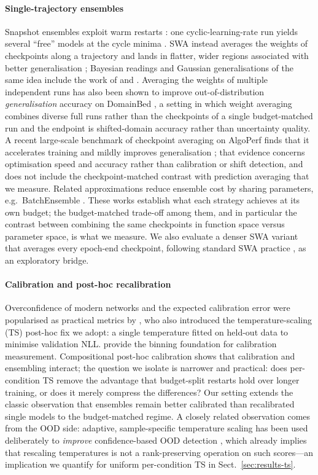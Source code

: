 \documentclass[11pt,a4paper]{article}
\newcommand{\swa}{\textsc{SWA}}
\newcommand{\ts}{\textsc{TS}}
\begin{document}
\paragraph{Single-trajectory ensembles}
Snapshot ensembles exploit warm restarts \citep{loshchilov2017}: one
cyclic-learning-rate run yields several ``free'' models at the cycle minima
\citep{huang2017}. \swa{} instead averages the weights of checkpoints along
a trajectory and lands in flatter, wider regions associated with better
generalisation \citep{izmailov2018}; Bayesian readings and Gaussian
generalisations of the same idea include the work of
\citet{wilson2020} and \citet{maddox2019}. Averaging the weights of
multiple independent runs has also been shown to improve out-of-distribution
\emph{generalisation} accuracy on DomainBed \citep{rame2022}, a setting in
which weight averaging combines diverse full runs rather than the
checkpoints of a single budget-matched run and the endpoint is shifted-domain
accuracy rather than uncertainty quality. A recent large-scale benchmark
of checkpoint averaging on AlgoPerf finds that it accelerates training and
mildly improves generalisation \citep{ajroldi2025}; that evidence concerns
optimisation speed and accuracy rather than calibration or shift detection,
and does not include the checkpoint-matched contrast with prediction averaging that
we measure. Related approximations reduce
ensemble cost by sharing parameters, e.g.\ BatchEnsemble
\citep{wen2020}. These works establish what each strategy achieves at its
own budget; the budget-matched trade-off among them, and in particular the
contrast between combining the same checkpoints in function space versus
parameter space, is what we measure. We also evaluate a denser \swa{}
variant that averages every epoch-end checkpoint, following standard \swa{}
practice \citep{izmailov2018}, as an exploratory bridge.

\paragraph{Calibration and post-hoc recalibration}
Overconfidence of modern networks and the expected calibration error were
popularised as practical metrics by \citet{guo2017}, who also introduced the
temperature-scaling (\ts) post-hoc fix we adopt: a single temperature fitted
on held-out data to minimise validation NLL. \citet{naeini2015} provide the
binning foundation for calibration measurement. Compositional post-hoc
calibration \citep{zhang2020} shows that calibration and ensembling
interact; the question we isolate is narrower and practical: does per-condition
\ts{} remove the advantage that budget-split restarts hold over longer
training, or does it merely compress the differences? Our setting extends
the classic observation that ensembles remain better calibrated than
recalibrated single models \citep{lakshminarayanan2017} to the
budget-matched regime. A closely related observation comes from the OOD
side: adaptive, sample-specific temperature scaling has been used
deliberately to \emph{improve} confidence-based OOD detection
\citep{krumpl2024}, which already implies that rescaling temperatures is
not a rank-preserving operation on such scores---an implication we quantify
for uniform per-condition \ts{} in Sect.~\ref{sec:results-ts}.
\end{document}

